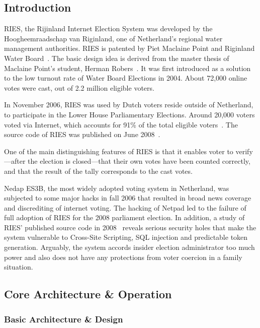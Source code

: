 \subsection{Introduction}

RIES, the Rijinland Internet Election System was developed by the
Hoogheemraadschap van Riginland, one of Netherland's regional water
management authorities. RIES is patented by Piet Maclaine Point and
Riginland Water Board~\cite{hubbers2004}. The basic design idea is
derived from the master thesis of Maclaine Point's student, Herman
Robers~\cite{robers1998}. It was first introduced as a solution to the
low turnout rate of Water Board Elections in 2004. About 72,000 online
votes were cast, out of 2.2 million eligible voters.

In November 2006, RIES was used by Dutch voters reside outside of
Netherland, to participate in the Lower House Parliamentary
Elections. Around 20,000 voters voted via Internet, which accounts for
91\% of the total eligible voters~\cite{competence2014}. The source
code of RIES was published on June 2008~\cite{gonggrijp2009}.

One of the main distinguishing features of RIES is that it enables
voter to verify---after the election is closed---that their own votes
have been counted correctly, and that the result of the tally
corresponds to the cast votes.

Nedap ES3B, the most widely adopted voting system in Netherland, was
subjected to some major hacks in fall 2006 that resulted in broad news
coverage and discrediting of internet voting. The hacking of Netpad
led to the failure of full adoption of RIES for the 2008 parliament
election. In addition, a study of RIES' published source code in
2008~\cite{gonggrijp2009} reveals serious security holes that make the
system vulnerable to Cross-Site Scripting, SQL injection and
predictable token generation. Arguably, the system accords insider
election administrator too much power and also does not have any
protections from voter coercion in a family situation.

\subsection{Core Architecture \& Operation}

\subsubsection{Basic Architecture \& Design}

